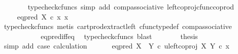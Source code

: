 \begin{isabellebody}
\ \ \ \ \ \ \isamarkupfalse%
\ {\isacharparenleft}{\kern0pt}typecheck{\isacharunderscore}{\kern0pt}cfuncs{\isacharcomma}{\kern0pt}\ simp\ add{\isacharcolon}{\kern0pt}\ comp{\isacharunderscore}{\kern0pt}associative{}\ left{\isacharunderscore}{\kern0pt}coproj{\isacharunderscore}{\kern0pt}cfunc{\isacharunderscore}{\kern0pt}coprod{\isacharparenright}{\kern0pt}\isanewline
\ \ \ \ \isamarkupfalse%
\ \isamarkupfalse%
\ {\isachardoublequoteopen}{\isachardot}{\kern0pt}{\isachardot}{\kern0pt}{\isachardot}{\kern0pt}\ {\isacharequal}{\kern0pt}\ eq{\isacharunderscore}{\kern0pt}pred\ X\ {\isasymcirc}\isactrlsub c\ {\isasymlangle}x{\isacharcomma}{\kern0pt}\ x{\isasymrangle}{\isachardoublequoteclose}\isanewline
\ \ \ \ \ \ \isamarkupfalse%
\ {\isacharparenleft}{\kern0pt}typecheck{\isacharunderscore}{\kern0pt}cfuncs{\isacharcomma}{\kern0pt}\ metis\ cart{\isacharunderscore}{\kern0pt}prod{\isacharunderscore}{\kern0pt}extract{\isacharunderscore}{\kern0pt}left\ cfunc{\isacharunderscore}{\kern0pt}type{\isacharunderscore}{\kern0pt}def\ comp{\isacharunderscore}{\kern0pt}associative{\isacharparenright}{\kern0pt}\isanewline
\ \ \ \ \isamarkupfalse%
\ \isamarkupfalse%
\ {\isachardoublequoteopen}{\isachardot}{\kern0pt}{\isachardot}{\kern0pt}{\isachardot}{\kern0pt}\ {\isacharequal}{\kern0pt}\ {\isasymt}{\isachardoublequoteclose}\isanewline
\ \ \ \ \ \ \isamarkupfalse%
\ eq{\isacharunderscore}{\kern0pt}pred{\isacharunderscore}{\kern0pt}iff{\isacharunderscore}{\kern0pt}eq\ \isamarkupfalse%
\ {\isacharparenleft}{\kern0pt}typecheck{\isacharunderscore}{\kern0pt}cfuncs{\isacharcomma}{\kern0pt}\ blast{\isacharparenright}{\kern0pt}\isanewline
\ \ \ \ \isamarkupfalse%
\ \isamarkupfalse%
\ {\isacharquery}{\kern0pt}thesis\isanewline
\ \ \ \ \ \ \isamarkupfalse%
\ {\isacharparenleft}{\kern0pt}simp\ add{\isacharcolon}{\kern0pt}\ case{}\ calculation{\isacharparenright}{\kern0pt}\isanewline
\ \ \isamarkupfalse%
\isanewline
{}\isamarkupfalse%
\isanewline
\ \ \isamarkupfalse%
\ {\isachardoublequoteopen}eq{\isacharunderscore}{\kern0pt}pred\ {\isacharparenleft}{\kern0pt}X\ {\isasymCoprod}\ Y{\isacharparenright}{\kern0pt}\ {\isasymcirc}\isactrlsub c\ {\isasymlangle}u{\isacharcomma}{\kern0pt}left{\isacharunderscore}{\kern0pt}coproj\ X\ Y\ {\isasymcirc}\isactrlsub c\ x{\isasymrangle}\ {\isasymnoteq}\ {\isasymt}{\isachardoublequoteclose}\isanewline
\ \ \isamarkupfalse%

\end{isabellebody}
